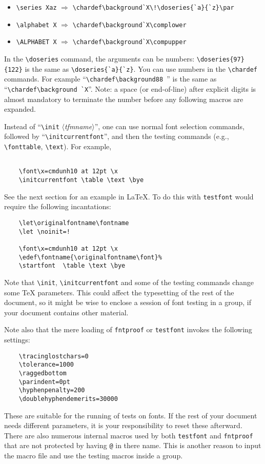 \documentclass[draft]{article}
\newcommand\file[1]{\texttt{#1}}
\renewcommand\"{\verb"}
\newcommand\meta[1]{$\langle$\textit{#1}$\rangle$}
\begin{document}
{\begin{itemize}
 \item \"\series Xaz" $\Rightarrow$ \"\chardef\background`X\!\doseries{`a}{`z}\par"
 \item \"\alphabet X" $\Rightarrow$ \"\chardef\background`X\complower"
 \item \"\ALPHABET X" $\Rightarrow$ \"\chardef\background`X\compupper"
\end{itemize}

In the \"\doseries" command, the arguments can be numbers:
\"\doseries{97}{122}" is the same as \"\doseries{`a}{`z}". You can use
numbers in the \"\chardef" commands. For example
``\"\chardef\background88 "'' is the same as ``\"\chardef\background `X"''. 
Note: a space (or end-of-line) after explicit digits is almost
mandatory to terminate the number before any following macros are
expanded.

Instead of ``\"\init" \meta{tfmname}'', one can use normal font 
selection commands, followed by ``\"\initcurrentfont"'', and then the 
testing commands (e.g., \"\fonttable", \"\text"). For example,
\begin{verbatim}
     
    \font\x=cmdunh10 at 12pt \x 
    \initcurrentfont \table \text \bye
\end{verbatim}
See the next section for an example in \LaTeX{}. To do this with 
\file{testfont} would require the following incantations:
\begin{verbatim}
    \let\originalfontname\fontname
    \let \noinit=! 
     
    \font\x=cmdunh10 at 12pt \x 
    \edef\fontname{\originalfontname\font}%
    \startfont  \table \text \bye
\end{verbatim}

Note that \"\init", \"\initcurrentfont" and some of the testing commands 
change some \TeX{} parameters. This could affect the typesetting of the 
rest of the document, so it might be wise to enclose a session of font 
testing in a group, if your document contains other material.

Note also that the mere loading of \file{fntproof} or \file{testfont} 
invokes the following settings:
\begin{verbatim}
    \tracinglostchars=0
    \tolerance=1000
    \raggedbottom
    \parindent=0pt
    \hyphenpenalty=200
    \doublehyphendemerits=30000
\end{verbatim}
These are suitable for the running of tests on fonts. If the rest of 
your document needs different parameters, it is your responsibility to 
reset these afterward. There are also numerous internal macros used by 
both \file{testfont} and \file{fntproof} that are not protected by 
having \texttt{@} in there name. This is another reason to input the 
macro file and use the testing macros inside a group. 

}
\end{document}
